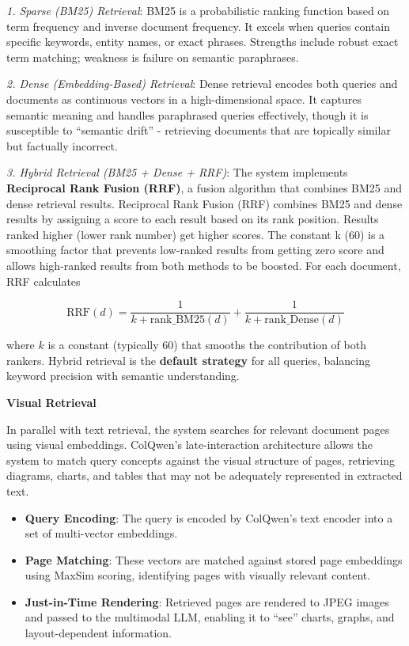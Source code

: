\textit{1. Sparse (BM25) Retrieval}: BM25 is a probabilistic ranking function based on term frequency and inverse document frequency. It excels when queries contain specific keywords, entity names, or exact phrases. Strengths include robust exact term matching; weakness is failure on semantic paraphrases.

\textit{2. Dense (Embedding-Based) Retrieval}: Dense retrieval encodes both queries and documents as continuous vectors in a high-dimensional space. It captures semantic meaning and handles paraphrased queries effectively, though it is susceptible to ``semantic drift'' - retrieving documents that are topically similar but factually incorrect.

\textit{3. Hybrid Retrieval (BM25 + Dense + RRF)}: The system implements \textbf{Reciprocal Rank Fusion (RRF)}, a fusion algorithm that combines BM25 and dense retrieval results. Reciprocal Rank Fusion (RRF) combines BM25 and dense results by assigning a score to each result based on its rank position. Results ranked higher (lower rank number) get higher scores. The constant k (60) is a smoothing factor that prevents low-ranked results from getting zero score and allows high-ranked results from both methods to be boosted. For each document, RRF calculates

\[
\text{RRF}(d) = \dfrac{1}{k + \text{rank\_BM25}(d)} + \dfrac{1}{k + \text{rank\_Dense}(d)}
\]

where $k$ is a constant (typically 60) that smooths the contribution of both rankers. Hybrid retrieval is the \textbf{default strategy} for all queries, balancing keyword precision with semantic understanding.

\textbf{Visual Retrieval}

In parallel with text retrieval, the system searches for relevant document pages using visual embeddings. ColQwen's late-interaction architecture allows the system to match query concepts against the visual structure of pages, retrieving diagrams, charts, and tables that may not be adequately represented in extracted text.

\begin{itemize}
    \item \textbf{Query Encoding}: The query is encoded by ColQwen's text encoder into a set of multi-vector embeddings.
    \item \textbf{Page Matching}: These vectors are matched against stored page embeddings using MaxSim scoring, identifying pages with visually relevant content.
    \item \textbf{Just-in-Time Rendering}: Retrieved pages are rendered to JPEG images and passed to the multimodal LLM, enabling it to ``see'' charts, graphs, and layout-dependent information.
\end{itemize}

